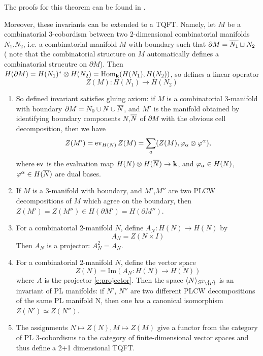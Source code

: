 The proofs for this theorem can be found in \cite{balsam-kirillov}.

Moreover, these invariants can be extended to a TQFT. Namely, let $M$ be a combinatorial 3-cobordism between 
two 2-dimensional combinatorial manifolds $N_1$,$N_2$, i.e. a combinatorial manifold $M$ with boundary such
 that $\partial M = \overline{N_1} \sqcup N_2$ ( note that the combinatorial structure on $M$ automatically defines a 
 combinatorial strucutre on $\partial M$). Then $H(\partial M)=H(N_1)^* \otimes H(N_2)=\mathrm{Hom}_{\mathbf{k}} ( H(N_1),H(N_2))$, 
 so  defines a linear operator
\[
Z(M): H(N_1) \rightarrow H(N_2)
\]

\begin{theorem}\label{t:main2}
\par\noindent
	\begin{enumerate}
		\item So defined invariant satisfies gluing axiom: if $M$ is a combinatorial 3-manifold with boundary 
		$\partial M=N_0 \cup N \cup \overline{N}$, and $M'$ is the manifold obtained by identifying boundary components 
		$N$,$\overline{N}$ of $\partial M$ with the obvious cell decomposition, then we have
		\[
		Z(M')= \operatorname{ev}_{H(N)} Z(M) = \sum_a (Z(M),\varphi_\alpha \otimes \varphi^\alpha),
		\]
		where $\operatorname{ev}$ is the evaluation map $H(N)\otimes H(\overline{N}) \rightarrow  \mathbf{k} $, and $\varphi_\alpha \in H(N)$,
		 $\varphi^\alpha \in H(\overline{N})$ are dual bases.
		\item If $M$ is a 3-manifold with boundary, and $M'$,$M''$ are two PLCW decompositions of $M$ which 
		agree on the boundary, then $Z(M')=Z(M'') \in H( \partial M')=H(\partial M'')$.
		\item For a combinatorial 2-manifold $N$, define $A_N:H(N) \rightarrow H(N)$ by
		\begin{equation}\label{e:projector}
			A_N=Z(N \times I)
		\end{equation}
		Then $A_N$ is a projector: $A^2_N = A_N$.
		\item For a combinatorial 2-manifold $N$, define the vector space
		\begin{equation}
			Z(N)= \mathrm{Im}(A_N:H(N) \rightarrow H(N))
		\end{equation}
		where $A$ is the projector \eqref{e:projector}. Then the space $\langle N\rangle_{S^2\setminus\{p\}}$ is an invariant of PL 
		manifolds: if $N'$, $N''$ are two different PLCW decompositions of the same PL manifold N, then one has a
		 canonical isomorphism $Z(N') \simeq Z(N'')$.
		\item The assignments $N \mapsto Z(N), M \mapsto Z(M)$ give a functor from the category of PL 3-cobordisms
		 to the category of finite-dimensional vector spaces and thus define a 2+1 dimensional TQFT.
		\end{enumerate}
\end{theorem}


